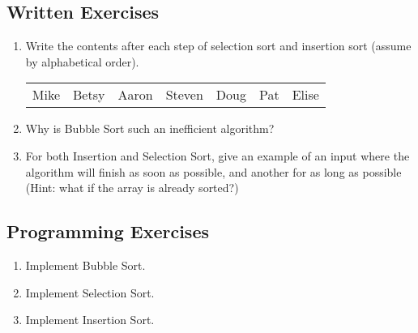 \subsection{Written Exercises}

\setcounter{counter}{1}
\begin{enumerate}[label={\arabic{counter}\addtocounter{counter}{1}}.]

\item Write the contents after each step of selection sort and insertion sort (assume by alphabetical order).
\begin{table}
\begin{tabular}{l l l l l l l}
Mike & Betsy & Aaron & Steven & Doug & Pat & Elise
\end{tabular}
\end{table}

\item Why is Bubble Sort such an inefficient algorithm?

\item For both Insertion and Selection Sort, give an example of an input where the algorithm will finish as soon as possible, and another for as long as possible (Hint: what if the array is already sorted?)

\end{enumerate}

\subsection{Programming Exercises}

\setcounter{counter}{1}
\begin{enumerate}[label={\arabic{counter}\addtocounter{counter}{1}}.]

\item Implement Bubble Sort.
\item Implement Selection Sort.
\item Implement Insertion Sort.

\end{enumerate}